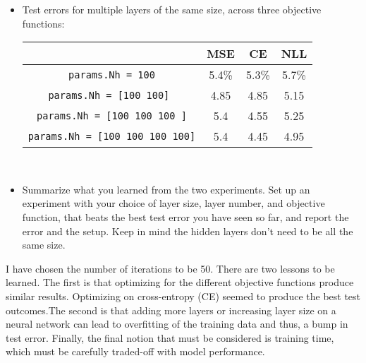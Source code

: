 \documentclass[12pt]{amsart}
\begin{document}
\begin{enumerate}
{{\begin{enumerate}
{{{{{\begin{itemize}
\item Test errors for multiple layers of the same size, across three objective functions: \\

\begin{tabular}{|c|c|c|c|}\hline
 & MSE & CE & NLL \\ \hline
 \verb{params.Nh = 100{ &5.4\%&5.3\%&5.7\% \\ \hline
 \verb{params.Nh = [100 100] { &4.85& 4.85& 5.15 \\ \hline
 \verb{params.Nh = [100 100 100 ]{ &5.4&4.55&5.25 \\ \hline
  \verb{params.Nh = [100 100 100 100]{ &5.4& 4.45&4.95 \\ \hline
\end{tabular}\\

\item Summarize what you learned from the two experiments. Set up an experiment 
with your choice of layer size, layer number, and objective function, that beats the best test error you have seen so far, and report the error and the setup. Keep in mind the hidden layers don't need to be all the same size. \\
\end{itemize}

\noindent I have chosen the number of iterations to be 50.  There are two lessons to be learned.  The first is that optimizing for the different objective functions produce similar results.  Optimizing on cross-entropy (CE) seemed to produce the best test outcomes.The second is that adding more layers or increasing layer size on a neural network can lead to overfitting of the training data and thus, a bump in test error.  Finally, the final notion that must be considered is training time, which must be carefully traded-off with model performance.\\

}}}}}
\end{enumerate}}}
\end{enumerate}
\end{document}
